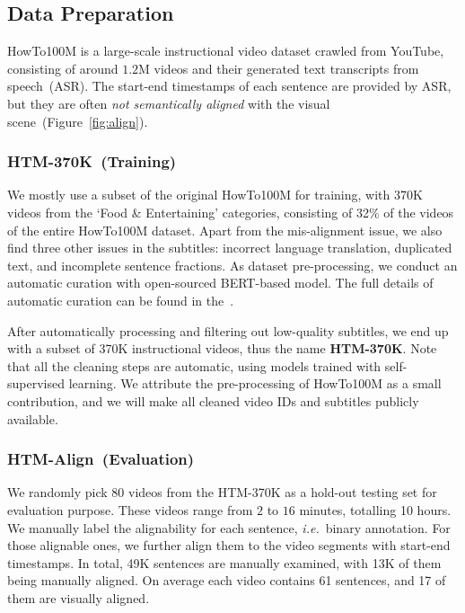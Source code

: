 \vspace{-1mm}
\subsection{Data Preparation}
\vspace{-1mm}
HowTo100M is a large-scale instructional video dataset crawled from YouTube,
consisting of around $1.2$M videos and their generated text transcripts from speech~(ASR).
The start-end timestamps of each sentence are provided by ASR, 
but they are often {\em not semantically aligned} with the visual scene~(Figure~\ref{fig:align}). 

\vspace{-.4cm}
\subsubsection{HTM-370K~(Training)} 
\vspace{-2mm}
We mostly use a subset of the original HowTo100M for training,
with 370K videos from the `Food \& Entertaining' categories,
consisting of 32\% of the videos of the entire HowTo100M dataset.
Apart from the mis-alignment issue, we also find three other issues in the subtitles:
incorrect language translation, duplicated text, and incomplete sentence fractions.
As dataset pre-processing, 
we conduct an automatic curation with open-sourced BERT-based model.
The full details of automatic curation can be found in the~\app.

After automatically processing and filtering out low-quality subtitles, 
we end up with a subset of 370K instructional videos, thus the name \textbf{HTM-370K}.
Note that all the cleaning steps are automatic, using models trained with self-supervised learning.
We attribute the pre-processing of HowTo100M as a small contribution,
and we will make all cleaned video IDs and subtitles publicly available.

\vspace{-7pt}
\subsubsection{HTM-Align~(Evaluation)} 
\vspace{-2mm}
We randomly pick 80 videos from the HTM-370K as a hold-out testing set for evaluation purpose.
These videos range from $2$ to $16$ minutes, totalling 10 hours.
We manually label the alignability for each sentence, 
{\em i.e.}~binary annotation.
For those alignable ones, 
we further align them to the video segments with start-end timestamps.
In total, 
49K sentences are manually examined, with 13K of them being manually aligned.
On average each video contains 61 sentences, and 17 of them are visually aligned.

